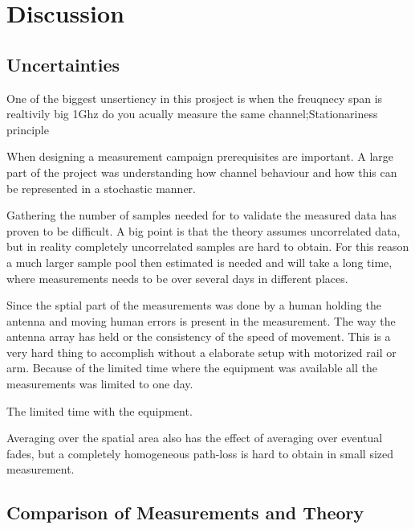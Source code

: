\chapter{Discussion}
\section{Uncertainties}
One of the biggest unsertiency in this prosject is when the freuqnecy span is realtivily big 1Ghz do you acually measure the same channel;Stationariness principle

When designing a measurement campaign prerequisites are important. A large part of the project was understanding how channel behaviour and how this can be represented in a stochastic manner. 

Gathering the number of samples needed for to validate the measured data has proven to be difficult. A big point is that the theory assumes uncorrelated data, but in reality completely uncorrelated samples are hard to obtain. For this reason a much larger sample pool then estimated is needed and will take a long time, where measurements needs to be over several days in different places.

Since the sptial part of the measurements was done by a human holding the antenna and moving human errors is present in the measurement. The way the antenna array has held or the consistency of the speed of movement. This is a very hard thing to accomplish without a elaborate setup with motorized rail or arm. Because of the limited time where the equipment was available all the measurements was limited to one day.

The limited time with the equipment.


Averaging over the spatial  area also has the effect of averaging over eventual fades, but a completely homogeneous path-loss is hard to obtain in small sized measurement.

\section{Comparison of Measurements and Theory}